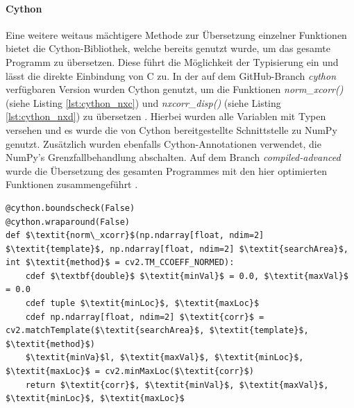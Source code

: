 \paragraph{Cython}

Eine weitere weitaus mächtigere Methode zur Übersetzung einzelner Funktionen bietet die Cython-Bibliothek, welche bereits genutzt wurde, um das gesamte Programm zu übersetzen. Diese führt die Möglichkeit der Typisierung ein und lässt die direkte Einbindung von C zu. In der auf dem GitHub-Branch \textit{cython} verfügbaren Version wurden Cython genutzt, um die Funktionen \textit{norm\_xcorr()} (siehe Listing \ref{lst:cython_nxc}) und \textit{nxcorr\_disp()} (siehe Listing \ref{lst:cython_nxd}) zu übersetzen \cite{Coj17}. Hierbei wurden alle Variablen mit Typen versehen und es wurde die von Cython bereitgestellte Schnittstelle zu NumPy genutzt. Zusätzlich wurden ebenfalls Cython-Annotationen verwendet, die NumPy's Grenzfallbehandlung abschalten. Auf dem Branch \textit{compiled-advanced} wurde die Übersetzung des gesamten Programmes mit den hier optimierten Funktionen zusammengeführt \cite{Coj17}. 

\begin{lstlisting}[caption={Die in Cython optimierte Funktion norm\_xcorr()}, label={lst:cython_nxc}]
@cython.boundscheck(False)
@cython.wraparound(False)
def $\textit{norm\_xcorr}$(np.ndarray[float, ndim=2] $\textit{template}$, np.ndarray[float, ndim=2] $\textit{searchArea}$, int $\textit{method}$ = cv2.TM_CCOEFF_NORMED):
	cdef $\textbf{double}$ $\textit{minVal}$ = 0.0, $\textit{maxVal}$ = 0.0
	cdef tuple $\textit{minLoc}$, $\textit{maxLoc}$
	cdef np.ndarray[float, ndim=2] $\textit{corr}$ = cv2.matchTemplate($\textit{searchArea}$, $\textit{template}$, $\textit{method}$)
	$\textit{minVa}$l, $\textit{maxVal}$, $\textit{minLoc}$, $\textit{maxLoc}$ = cv2.minMaxLoc($\textit{corr}$)
	return $\textit{corr}$, $\textit{minVal}$, $\textit{maxVal}$, $\textit{minLoc}$, $\textit{maxLoc}$
\end{lstlisting}

